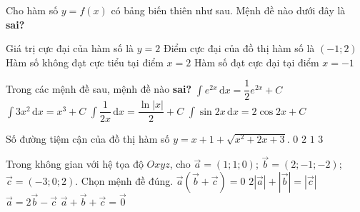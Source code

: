 \begin{ex}%
	Cho hàm số $y=f(x)$ có bảng biến thiên như sau.
	Mệnh đề nào dưới đây là \textbf{sai?}
	\begin{center}
	\end{center}
	\choice
	{Giá trị cực đại của hàm số là $y=2$}
	{Điểm cực đại của đồ thị hàm số là $\left(-1;2\right)$}
	{\True Hàm số không đạt cực tiểu tại điểm $x=2$}
	{Hàm số đạt cực đại tại điểm $x=-1$}
\end{ex}
\begin{ex}%
	Trong các mệnh đề sau, mệnh đề nào \textbf{sai?}
	\choice
	{$\displaystyle\int{e^{2x}\mathrm{\,d}x}=\dfrac{1}{2}e^{2x}+C$}
	{$\displaystyle\int{3x^2\mathrm{\,d}x}=x^3+C$}
	{$\displaystyle\int{\dfrac{1}{2x}\mathrm{\,d}x}=\dfrac{\ln \left| x\right|}{2}+C$}
	{\True $\displaystyle\int{\sin 2x\mathrm{\,d}x}=2\cos 2x+C$}
\end{ex}
\begin{ex}%
	Số đường tiệm cận của đồ thị hàm số $y=x+1+\sqrt{x^2+2 x+3}$.
	\choice
	{$0$}
	{$2$}
	{\True $1$}
	{$3$}
\end{ex}
\begin{ex}%
	Trong không gian với hệ tọa độ $Oxyz$, cho $\vec{a}=(1;1;0)$; $\vec{b}=\left(2;-1;-2\right)$; $\vec{c}=(-3;0;2)$. Chọn mệnh đề đúng.
	\choice
	{$\vec{a}(\vec{b}+\vec{c})=0$}
	{$2\left| \vec{a}\right|+\left| \vec{b}\right|=\left| \vec{c}\right|$}
	{$\vec{a}=2\vec{b}-\vec{c}$}
	{\True $\vec{a}+\vec{b}+\vec{c}=\vec{0}$}
\end{ex}
